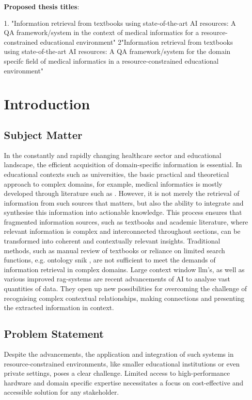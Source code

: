 \textbf{Proposed thesis titles}:

1. "Information retrieval from textbooks using state-of-the-art AI resources: 
A QA framework/system in the context of medical informatics for a resource-constrained educational environment"
2"Information retrieval from textbooks using state-of-the-art AI resources: 
A QA framework/system for the domain specifc field of medical informatics in a resource-constrained educational environment"
%
\chapter{Introduction}\label{ch:introduction}
\section{Subject Matter}
In the constantly and rapidly changing healthcare sector and educational landscape, the efficient acquisition of domain-specific information is essential. 
In educational contexts such as universities, the basic practical and theoretical approach to complex domains, for example, medical informatics is mostly developed through literature such as \citet{bb2}.
However, it is not merely the retrieval of information from such sources that matters, but also the ability to integrate and synthesise this information into actionable knowledge.
This process ensures that fragmented information sources, such as textbooks and academic literature, where relevant information is complex and interconnected throughout sections, can be transformed into coherent and contextually relevant insights.
Traditional methods, such as manual review of textbooks or reliance on limited search functions, e.g. ontology \ac{snik} \citep{semantischesnetz}, are not sufficient to meet the demands of information retrieval in complex domains.  
%
Large context window \ac{llm}'s, as well as various improved \ac{rag}-systems are recent advancements of AI to analyse vast quantities of data.
They open up new possibilities for overcoming the challenge of recognising complex contextual relationships, making connections and presenting the extracted information in context.
%
\section{Problem Statement}\label{ch:problem statement}
Despite the advancements, the application and integration of such systems in resource-constrained environments, like smaller educational institutions or even private settings, poses a clear challenge.
Limited access to high-performance hardware and domain specific expertise necessitates a focus on cost-effective and accessible solution for any stakeholder.
